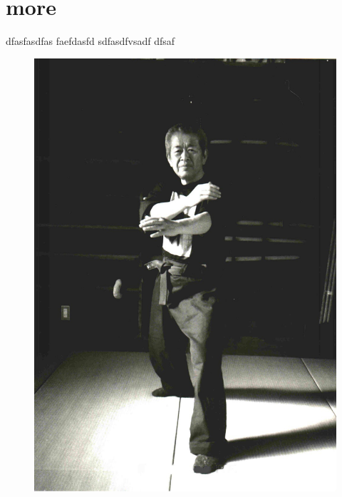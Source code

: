 \section{more}\label{more}

dfasfasdfas faefdasfd sdfasdfvsadf dfsaf

\begin{figure}
\centering
\includegraphics{./kamae_img.eps}
\caption{}
\end{figure}
